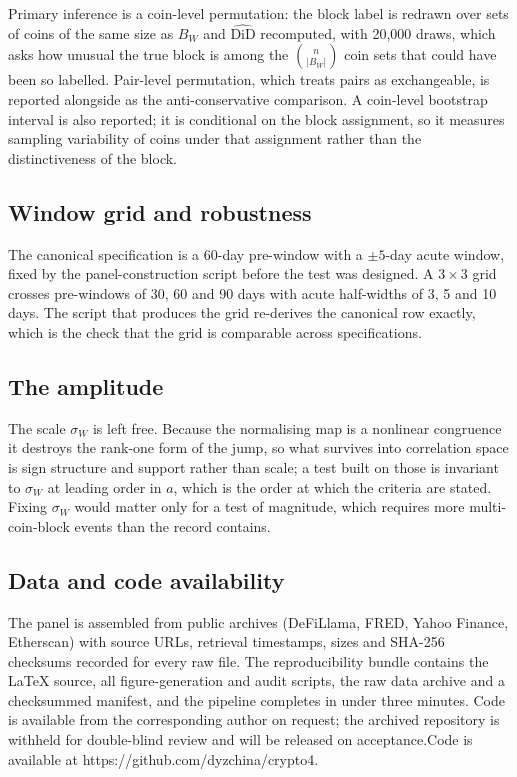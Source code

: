 Primary inference is a coin-level permutation: the block label is redrawn over sets of coins of the same size as $B_W$ and $\widehat{\mathrm{DiD}}$ recomputed, with 20{,}000 draws, which asks how unusual the true block is among the $\binom{n}{|B_W|}$ coin sets that could have been so labelled. Pair-level permutation, which treats pairs as exchangeable, is reported alongside as the anti-conservative comparison. A coin-level bootstrap interval is also reported; it is conditional on the block assignment, so it measures sampling variability of coins under that assignment rather than the distinctiveness of the block.

\subsection*{Window grid and robustness}
The canonical specification is a 60-day pre-window with a $\pm5$-day acute window, fixed by the panel-construction script before the test was designed. A $3\times3$ grid crosses pre-windows of 30, 60 and 90 days with acute half-widths of 3, 5 and 10 days. The script that produces the grid re-derives the canonical row exactly, which is the check that the grid is comparable across specifications.

\subsection*{The amplitude}
The scale $\sigma_W$ is left free. Because the normalising map is a nonlinear congruence it destroys the rank-one form of the jump, so what survives into correlation space is sign structure and support rather than scale; a test built on those is invariant to $\sigma_W$ at leading order in $a$, which is the order at which the criteria are stated. Fixing $\sigma_W$ would matter only for a test of magnitude, which requires more multi-coin-block events than the record contains.

\subsection*{Data and code availability}
The panel is assembled from public archives (DeFiLlama, FRED, Yahoo Finance, Etherscan) with source URLs, retrieval timestamps, sizes and SHA-256 checksums recorded for every raw file. The reproducibility bundle contains the LaTeX source, all figure-generation and audit scripts, the raw data archive and a checksummed manifest, and the pipeline completes in under three minutes. \ifanon Code is available from the corresponding author on request; the archived repository is withheld for double-blind review and will be released on acceptance.\else Code is available at https://github.com/dyzchina/crypto4.\fi
